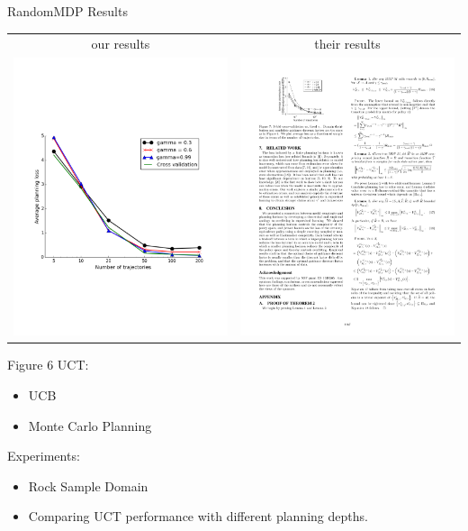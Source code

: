 \documentclass{beamer}
\begin{document}
\begin{frame}{RandomMDP Results}
\begin{tabular}{cc}
our results & their results \\
	\includegraphics[page=1,height=.55\textheight,width=.5\textwidth]{../results/figure_2.pdf} &
	\includegraphics[page=1,width=.41\textwidth]{../results/originalCV.pdf}
\end{tabular}
\end{frame}



\begin{frame}{Figure 6}
UCT: 
\begin{itemize}
\item UCB
\item Monte Carlo Planning
\end{itemize}

Experiments:
\begin{itemize}
\item Rock Sample Domain
\item Comparing UCT performance with different planning depths.
\end{itemize}
\end{frame}
\end{document}
